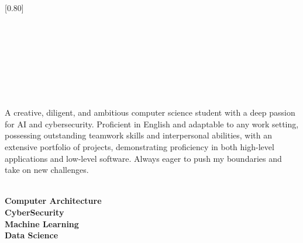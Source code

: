 \documentclass[lighthipster]{simplehipstercv}
\begin{document}
\setlength{\columnsep}{1cm}
[0.80]
\begin{paracol}{2}
 
\paracolbackgroundoptions
 
 
 
 
\footnotesize
{\setasidefontcolour
\flushright
\begin{center}
\end{center}
\begin{flushleft}
 
 \\[0.5em]
\\[0.5em]
\\[0.5em]
\\[0.5em]
\\[0.5em]
 
\bigskip
 
\\[0.5em]
 
{\footnotesize

A creative, diligent, and ambitious computer science student with a deep passion for AI and cybersecurity. Proficient in English and adaptable to any work setting, possessing outstanding teamwork skills and interpersonal abilities, with an extensive portfolio of projects, demonstrating proficiency in both high-level applications and low-level software. Always eager to push my boundaries and take on new challenges.}
\bigskip
 
 
 
 
 
 
 
 
\bigskip
 
 
\\[0.5em]
 
\textbf{Computer Architecture}\\
\textbf{CyberSecurity} \\
\textbf{Machine Learning} \\
\textbf{Data Science}
 

\end{flushleft}}
\end{paracol}
\end{document}
